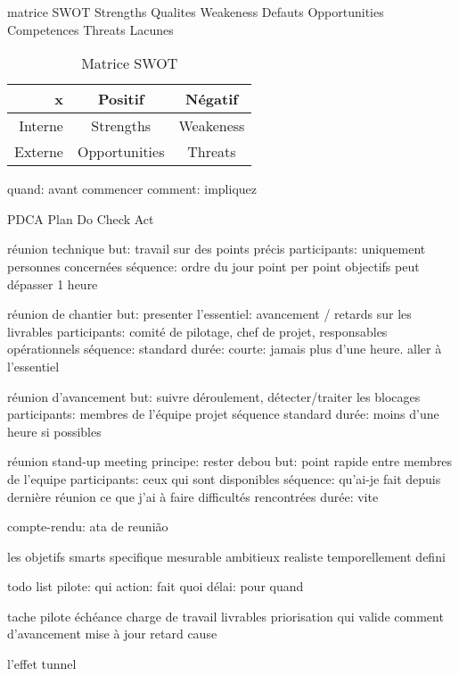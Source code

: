 \documentclass{article}
\begin{document}
matrice SWOT
    Strengths Qualites
    Weakeness Defauts
    Opportunities Competences
    Threats Lacunes
    \begin{table}[H]
        \centering\begin{tabular}{r|c|c}
            x       & Positif       & Négatif  \\\hline
            Interne & Strengths     & Weakeness\\\hline
            Externe & Opportunities & Threats  \\\hline
        \end{tabular}
        \caption{Matrice SWOT}
        \label{tab:SWOT}
    \end{table}
    quand: avant commencer
    comment: impliquez

PDCA
    Plan
    Do
    Check
    Act

réunion technique
    but: travail sur des points précis
    participants: uniquement personnes concernées
    séquence:
        ordre du jour
        point per point
        objectifs
    peut dépasser 1 heure

réunion de chantier
    but: presenter l'essentiel: avancement / retards sur les livrables
    participants: comité de pilotage, chef de projet, responsables opérationnels
    séquence: standard
    durée: courte: jamais plus d'une heure. aller à l'essentiel

réunion d'avancement
    but: suivre déroulement, détecter/traiter les blocages
    participants: membres de l'équipe projet
    séquence standard
    durée: moins d'une heure si possibles

réunion stand-up meeting
    principe: rester debou
    but: point rapide entre membres de l'equipe
    participants: ceux qui sont disponibles
    séquence:
        qu'ai-je fait depuis dernière réunion
        ce que j'ai à faire
        difficultés rencontrées
    durée: vite

compte-rendu: ata de reunião

les objetifs smarts
    specifique
    mesurable
    ambitieux
    realiste
    temporellement defini

todo list
    pilote: qui
    action: fait quoi
    délai: pour quand
    
    tache pilote échéance charge de travail livrables priorisation qui valide comment d'avancement mise à jour retard cause

l'effet tunnel
\end{document}
